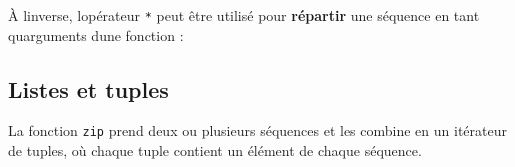 \begin{Shaded}
\begin{Highlighting}[]
\OperatorTok{*}
     

\OperatorTok{\textgreater{}\textgreater{}\textgreater{}}\NormalTok{, }\NormalTok{, }\NormalTok{)}
\end{Highlighting}
\end{Shaded}

À l\textquotesingle inverse, l\textquotesingle opérateur \texttt{*} peut
être utilisé pour \textbf{répartir} une séquence en tant
qu\textquotesingle arguments d\textquotesingle une fonction :

\begin{Shaded}
\begin{Highlighting}[]
\OperatorTok{\textgreater{}\textgreater{}\textgreater{}}\OperatorTok{=}\NormalTok{ (}\NormalTok{, }\NormalTok{)}
\OperatorTok{\textgreater{}\textgreater{}\textgreater{}} \NormalTok{(}\OperatorTok{*}
\NormalTok{(}\NormalTok{, }\NormalTok{)}
\end{Highlighting}
\end{Shaded}

\hypertarget{listes-et-tuples}{%
\subsection{Listes et tuples}\label{listes-et-tuples}}

La fonction \texttt{zip} prend deux ou plusieurs séquences et les
combine en un itérateur de tuples, où chaque tuple contient un élément
de chaque séquence.

\begin{Shaded}
\begin{Highlighting}[]
\OperatorTok{\textgreater{}\textgreater{}\textgreater{}}\OperatorTok{=} 
\OperatorTok{\textgreater{}\textgreater{}\textgreater{}}\OperatorTok{=}\NormalTok{ [}\NormalTok{, }\NormalTok{, }\NormalTok{]}
\OperatorTok{\textgreater{}\textgreater{}\textgreater{}} 
\OperatorTok{\textless{}} \OperatorTok{\textgreater{}}
\end{Highlighting}
\end{Shaded}

